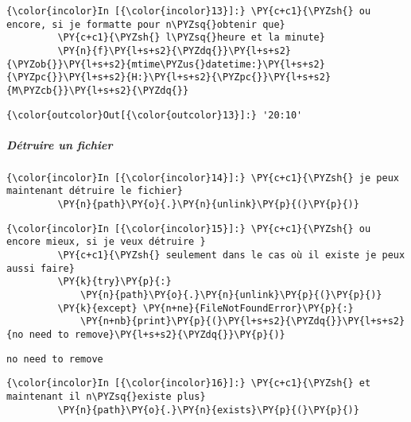     \begin{Verbatim}[commandchars=\\\{\}]
{\color{incolor}In [{\color{incolor}13}]:} \PY{c+c1}{\PYZsh{} ou encore, si je formatte pour n\PYZsq{}obtenir que}
         \PY{c+c1}{\PYZsh{} l\PYZsq{}heure et la minute}
         \PY{n}{f}\PY{l+s+s2}{\PYZdq{}}\PY{l+s+s2}{\PYZob{}}\PY{l+s+s2}{mtime\PYZus{}datetime:}\PY{l+s+s2}{\PYZpc{}}\PY{l+s+s2}{H:}\PY{l+s+s2}{\PYZpc{}}\PY{l+s+s2}{M\PYZcb{}}\PY{l+s+s2}{\PYZdq{}}
\end{Verbatim}


\begin{Verbatim}[commandchars=\\\{\}]
{\color{outcolor}Out[{\color{outcolor}13}]:} '20:10'
\end{Verbatim}
            
    \hypertarget{duxe9truire-un-fichier}{%
\subparagraph{Détruire un fichier}\label{duxe9truire-un-fichier}}

    \begin{Verbatim}[commandchars=\\\{\}]
{\color{incolor}In [{\color{incolor}14}]:} \PY{c+c1}{\PYZsh{} je peux maintenant détruire le fichier}
         \PY{n}{path}\PY{o}{.}\PY{n}{unlink}\PY{p}{(}\PY{p}{)}
\end{Verbatim}


    \begin{Verbatim}[commandchars=\\\{\}]
{\color{incolor}In [{\color{incolor}15}]:} \PY{c+c1}{\PYZsh{} ou encore mieux, si je veux détruire }
         \PY{c+c1}{\PYZsh{} seulement dans le cas où il existe je peux aussi faire}
         \PY{k}{try}\PY{p}{:} 
             \PY{n}{path}\PY{o}{.}\PY{n}{unlink}\PY{p}{(}\PY{p}{)}
         \PY{k}{except} \PY{n+ne}{FileNotFoundError}\PY{p}{:}
             \PY{n+nb}{print}\PY{p}{(}\PY{l+s+s2}{\PYZdq{}}\PY{l+s+s2}{no need to remove}\PY{l+s+s2}{\PYZdq{}}\PY{p}{)}
\end{Verbatim}


    \begin{Verbatim}[commandchars=\\\{\}]
no need to remove

    \end{Verbatim}

    \begin{Verbatim}[commandchars=\\\{\}]
{\color{incolor}In [{\color{incolor}16}]:} \PY{c+c1}{\PYZsh{} et maintenant il n\PYZsq{}existe plus}
         \PY{n}{path}\PY{o}{.}\PY{n}{exists}\PY{p}{(}\PY{p}{)}
\end{Verbatim}


